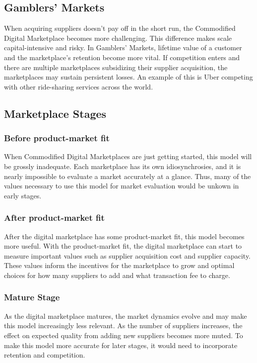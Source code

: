 \subsection{Gamblers' Markets}
When acquiring suppliers doesn't pay off in the short run, the Commodified Digital Marketplace becomes more challenging. This difference makes scale capital-intensive and risky. In Gamblers' Markets, lifetime value of a customer and the marketplace's retention become more vital. If competition enters and there are multiple marketplaces subsidizing their supplier acquisition, the marketplaces may sustain persistent losses. An example of this is Uber competing with other ride-sharing services across the world.

\subsection{Marketplace Stages}

\subsubsection{Before product-market fit}
When Commodified Digital Marketplaces are just getting started, this model will be grossly inadequate. Each marketplace has its own idiosynchrosies, and it is nearly impossible to evaluate a market accurately at a glance. Thus, many of the values necessary to use this model for market evaluation would be unkown in early stages.

\subsubsection{After product-market fit}
After the digital marketplace has some product-market fit, this model becomes more useful. With the product-market fit, the digital marketplace can start to measure important values such as supplier acquisition cost and supplier capacity. These values inform the incentives for the marketplace to grow and optimal choices for how many suppliers to add and what transaction fee to charge.

\subsubsection{Mature Stage}
As the digital marketplace matures, the market dynamics evolve and may make this model increasingly less relevant. As the number of suppliers increases, the effect on expected quality from adding new suppliers becomes more muted. To make this model more accurate for later stages, it would need to incorporate retention and competition.

